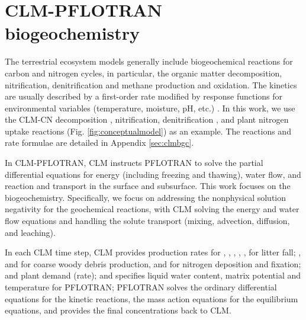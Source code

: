 \documentclass[gmd, manuscript]{copernicus}
\begin{document}
\section{CLM-PFLOTRAN biogeochemistry}
The terrestrial ecosystem models generally include biogeochemical reactions for
carbon and nitrogen cycles, in particular, the organic matter decomposition,
nitrification, denitrification and methane production and oxidation. The
kinetics are usually described by a first-order rate modified by response
functions for environmental variables (temperature, moisture, pH, etc.)
\citep{Bonan2012,Boyer2006,Schmidt2011}.  In this work, we use the CLM-CN
decomposition \citep{Bonan2012,Oleson2013,Thornton2005}, nitrification,
denitrification \citep{Dickinson2002,Parton2001,Parton1996}, and plant nitrogen
uptake reactions (Fig. \ref{fig:conceptualmodel}) as an example. The reactions
and rate formulae are detailed in Appendix \ref{sec:clmbgc}.


In CLM-PFLOTRAN, CLM instructs PFLOTRAN to solve the partial differential
equations for energy (including freezing and thawing), water flow, and reaction
and transport in the surface and subsurface. This work focuses on the
biogeochemistry. %
Specifically, we focus on addressing the nonphysical
solution negativity for the geochemical reactions, with CLM solving the energy and water
flow equations and handling the solute transport (mixing, advection, diffusion,
and leaching).

In each CLM time step, CLM provides production rates for ,
, , , ,  for litter
fall; , and  for coarse woody debris production,
 and  for nitrogen deposition and fixation; and
plant  demand (rate); and specifies liquid water content, matrix
potential and temperature for PFLOTRAN; PFLOTRAN solves the ordinary differential
equations for the kinetic reactions, the mass action equations for the
equilibrium equations, and provides the final concentrations back
to CLM.   
\end{document}
